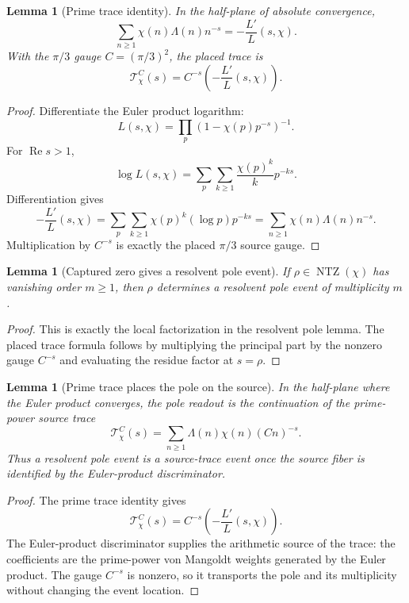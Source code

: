 \documentclass[11pt]{article}
\newtheorem{lemma}[definition]{Lemma}
\DeclareMathOperator{\Ree}{Re}
\DeclareMathOperator{\NTZ}{NTZ}
\begin{document}
\begin{lemma}[Prime trace identity]
In the half-plane of absolute convergence,
\[
  \sum_{n\ge1}\chi(n)\Lambda(n)n^{-s}
  =
  -\frac{L'}{L}(s,\chi).
\]
With the $\pi/3$ gauge $C=(\pi/3)^2$, the placed trace is
\[
  \mathcal T_\chi^C(s)
  =
  C^{-s}\left(-\frac{L'}{L}(s,\chi)\right).
\]
\end{lemma}

\begin{proof}
Differentiate the Euler product logarithm:
\[
  L(s,\chi)=\prod_p(1-\chi(p)p^{-s})^{-1}.
\]
For $\Ree s>1$,
\[
  \log L(s,\chi)
  =
  \sum_p\sum_{k\ge1}\frac{\chi(p)^k}{k}p^{-ks}.
\]
Differentiation gives
\[
  -\frac{L'}{L}(s,\chi)
  =
  \sum_p\sum_{k\ge1}\chi(p)^k(\log p)p^{-ks}
  =
  \sum_{n\ge1}\chi(n)\Lambda(n)n^{-s}.
\]
Multiplication by $C^{-s}$ is exactly the placed $\pi/3$ source gauge.
\end{proof}

\begin{lemma}[Captured zero gives a resolvent pole event]
If $\rho\in\NTZ(\chi)$ has vanishing order $m\ge1$, then $\rho$ determines a
resolvent pole event of multiplicity $m$.
\end{lemma}

\begin{proof}
This is exactly the local factorization in the resolvent pole lemma.  The
placed trace formula follows by multiplying the principal part by the nonzero
gauge $C^{-s}$ and evaluating the residue factor at $s=\rho$.
\end{proof}

\begin{lemma}[Prime trace places the pole on the source]
In the half-plane where the Euler product converges, the pole readout is the
continuation of the prime-power source trace
\[
  \mathcal T_\chi^C(s)
  =
  \sum_{n\ge1}\Lambda(n)\chi(n)(Cn)^{-s}.
\]
Thus a resolvent pole event is a source-trace event once the source fiber is
identified by the Euler-product discriminator.
\end{lemma}

\begin{proof}
The prime trace identity gives
\[
  \mathcal T_\chi^C(s)=C^{-s}\left(-\frac{L'}{L}(s,\chi)\right).
\]
The Euler-product discriminator supplies the arithmetic source of the trace:
the coefficients are the prime-power von Mangoldt weights generated by the
Euler product.  The gauge $C^{-s}$ is nonzero, so it transports the pole and
its multiplicity without changing the event location.
\end{proof}
\end{document}
